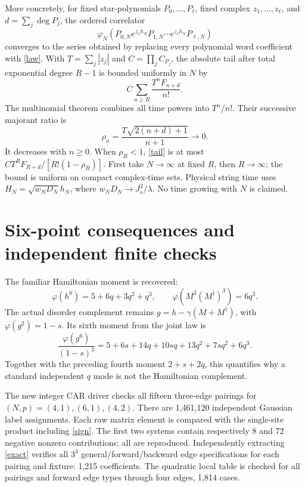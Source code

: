 \documentclass[11pt]{article}
\newcommand{\ph}{\varphi}
\begin{document}
More concretely, for fixed star-polynomials $P_0,\ldots,P_\ell$,
fixed complex $z_1,\ldots,z_\ell$, and $d=\sum_j\deg P_j$,
the ordered correlator
\begin{equation}\label{time}
 \ph_N\left(P_{0,N}e^{z_1h_N}P_{1,N}\cdots
                       e^{z_\ell h_N}P_{\ell,N}\right)
\end{equation}
converges to the series obtained by replacing every polynomial
word coefficient with \eqref{law}. With
$T=\sum_j|z_j|$ and $C=\prod_j C_{P_j}$, the absolute tail
after total exponential degree $R-1$ is bounded uniformly in $N$ by
\begin{equation}\label{tail}
 C\sum_{n\ge R}\frac{T^n F_{n+d}}{n!}.
\end{equation}
The multinomial theorem combines all time powers into $T^n/n!$.
Their successive majorant ratio is
\begin{equation}
 \rho_n=\frac{T\sqrt{2(n+d)+1}}{n+1}\longrightarrow0.
\end{equation}
It decreases with $n\ge0$. When $\rho_R<1$, \eqref{tail} is
at most $C T^R F_{R+d}/[R!(1-\rho_R)]$.
First take $N\to\infty$ at fixed $R$, then $R\to\infty$;
the bound is uniform on compact complex-time sets. Physical
string time uses $H_N=\sqrt{w_ND_N}h_N$, where
$w_ND_N\to J_s^2/\lambda$. No time growing with $N$ is claimed.

\newpage
\section{Six-point consequences and independent finite checks}
The familiar Hamiltonian moment is recovered:
\begin{equation}
 \ph(h^6)=5+6q+3q^2+q^3,\qquad
 \ph(M^3(M^\dagger)^3)=6q^3.
\end{equation}
The actual disorder complement remains
$g=h-\gamma(M+M^\dagger)$, with $\ph(g^2)=1-s$.
Its sixth moment from the joint law is
\begin{equation}\label{six}
 \frac{\ph(g^6)}{(1-s)^3}
 =5+6s+14q+10sq+13q^2+7sq^2+6q^3.
\end{equation}
Together with the preceding fourth moment $2+s+2q$, this
quantifies why a standard independent $q$ mode is not the
Hamiltonian complement.

The new integer CAR driver checks all fifteen three-edge pairings
for $(N,p)=(4,1),(6,1),(4,2)$. There are 1,461,120 independent
Gaussian label assignments. Each raw matrix element is compared
with the single-site product including \eqref{sign}. The first
two systems contain respectively 8 and 72 negative nonzero
contributions; all are reproduced. Independently extracting
\eqref{exact} verifies all $3^3$ general/forward/backward edge
specifications for each pairing and fixture: 1,215 coefficients.
The quadratic local table is checked for all pairings and forward
edge types through four edges, 1,814 cases.
\end{document}
